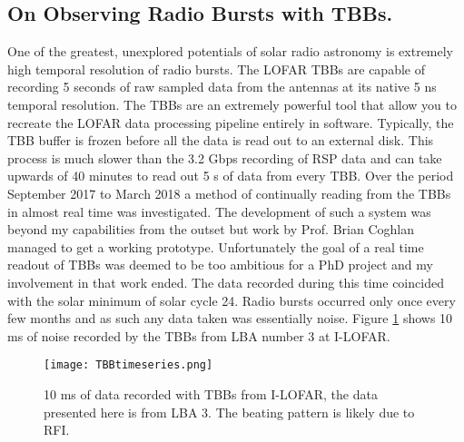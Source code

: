 \subsection{On Observing Radio Bursts with TBBs.}
One of the greatest, unexplored potentials of solar radio astronomy is extremely high temporal resolution of radio bursts. The LOFAR TBBs are capable of recording 5 seconds of raw sampled data from the antennas at its native 5 ns temporal resolution. The TBBs are an extremely powerful tool that allow you to recreate the LOFAR data processing pipeline entirely in software. Typically, the TBB buffer is frozen before all the data is read out to an external disk. This process is much slower than the 3.2 Gbps recording of RSP data and can take upwards of 40 minutes to read out 5 s of data from every TBB. Over the period September 2017 to March 2018 a method of continually reading from the TBBs in almost real time was investigated. The development of such a system was beyond my capabilities from the outset but work by Prof. Brian Coghlan managed to get a working prototype. Unfortunately the goal of a real time readout of TBBs was deemed to be too ambitious for a PhD project and my involvement in that work ended. The data recorded during this time coincided with the solar minimum of solar cycle 24. Radio bursts occurred only once every few months and as such any data taken was essentially noise. Figure \ref{fig:TBB_timeseries} shows 10 ms of noise recorded by the TBBs from LBA number 3 at I-LOFAR.
%
\begin{figure}[ht]
\centering
\texttt{[image: TBBtimeseries.png]}
\caption[10 ms of data recorded with TBBs from I-LOFAR.]{10 ms of data recorded with TBBs from I-LOFAR, the data presented here is from LBA 3. The beating pattern is likely due to RFI.}
\label{fig:TBB_timeseries}
\end{figure}

